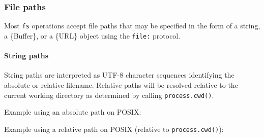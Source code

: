 \subsubsection{File paths}\label{file-paths}

Most \texttt{fs} operations accept file paths that may be specified in
the form of a string, a \{Buffer\}, or a \{URL\} object using the
\texttt{file:} protocol.

\paragraph{String paths}\label{string-paths}

String paths are interpreted as UTF-8 character sequences identifying
the absolute or relative filename. Relative paths will be resolved
relative to the current working directory as determined by calling
\texttt{process.cwd()}.

Example using an absolute path on POSIX:

\begin{Shaded}
\begin{Highlighting}[]
 \OperatorTok{;}

\OperatorTok{;}
\NormalTok{ \{}
\OperatorTok{=}  \NormalTok{(}\OperatorTok{,} \NormalTok{)}\OperatorTok{;}
\NormalTok{\} }\NormalTok{ \{}
  \NormalTok{()}\OperatorTok{;}
\NormalTok{\}}
\end{Highlighting}
\end{Shaded}

Example using a relative path on POSIX (relative to
\texttt{process.cwd()}):

\begin{Shaded}
\begin{Highlighting}[]
 \OperatorTok{;}

\OperatorTok{;}
\NormalTok{ \{}
\OperatorTok{=}  \NormalTok{(}\OperatorTok{,} \NormalTok{)}\OperatorTok{;}
\NormalTok{\} }\NormalTok{ \{}
  \NormalTok{()}\OperatorTok{;}
\NormalTok{\}}
\end{Highlighting}
\end{Shaded}

